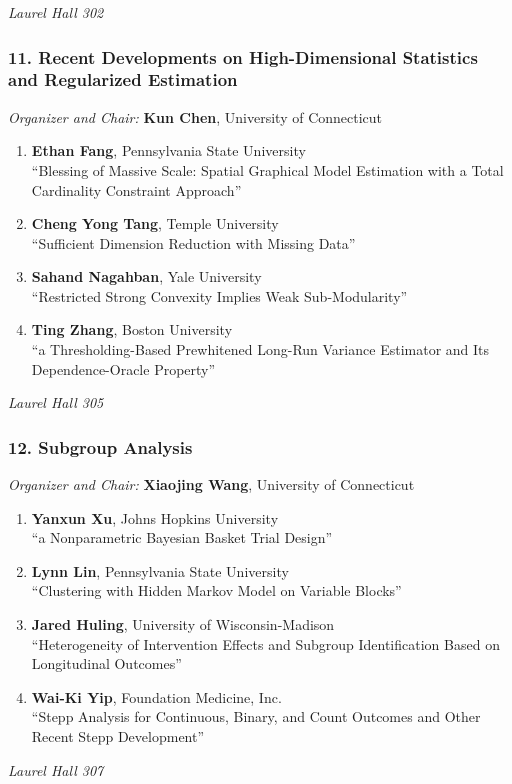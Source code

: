 \emph{Laurel Hall 302} \\[.5em]

\subsubsection*{11. Recent Developments on High-Dimensional Statistics and Regularized Estimation}

\emph{Organizer and Chair:} \textbf{Kun Chen}, University of Connecticut

\begin{enumerate}
\item \textbf{Ethan Fang}, Pennsylvania State University \\
``Blessing of Massive Scale: Spatial Graphical Model Estimation with a Total Cardinality Constraint Approach''
\item \textbf{Cheng Yong Tang}, Temple University \\
``Sufficient Dimension Reduction with Missing Data''
\item \textbf{Sahand Nagahban}, Yale University \\
``Restricted Strong Convexity Implies Weak Sub-Modularity''
\item \textbf{Ting Zhang}, Boston University \\
``a Thresholding-Based Prewhitened Long-Run Variance Estimator and Its Dependence-Oracle Property''
\end{enumerate}

\emph{Laurel Hall 305} \\[.5em]

\subsubsection*{12. Subgroup Analysis}

\emph{Organizer and Chair:} \textbf{Xiaojing Wang}, University of Connecticut

\begin{enumerate}
\item \textbf{Yanxun Xu}, Johns Hopkins University \\
``a Nonparametric Bayesian Basket Trial Design''
\item \textbf{Lynn Lin}, Pennsylvania State University \\
``Clustering with Hidden Markov Model on Variable Blocks''
\item \textbf{Jared Huling}, University of Wisconsin-Madison \\
``Heterogeneity of Intervention Effects and Subgroup Identification Based on Longitudinal Outcomes''
\item \textbf{Wai-Ki Yip}, Foundation Medicine, Inc. \\
``Stepp Analysis for Continuous, Binary, and Count Outcomes and Other Recent Stepp Development''
\end{enumerate}

\emph{Laurel Hall 307} \\[.5em]

